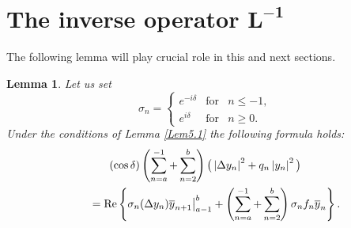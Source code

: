 \documentclass[11pt]{article}
\newtheorem{lemma}{Lemma}
\numberwithin{equation}{section}
\begin{document}
\section[The inverse operator $L^{-1}$]{The inverse operator $\boldsymbol{L^{-1}}$}\label{section6}

The following lemma will play crucial role in this and next sections.

\begin{lemma}
\label{Lem6.1} Let us set%
\begin{equation}
\sigma _{n}=\left\{
\begin{array}{lll}
e^{-i\delta } & \text{for} & n\leq -1, \\
e^{i\delta } & \text{for} & n\geq 0.%
\end{array}%
\right.  \label{6.1}
\end{equation}%
Under the conditions of Lemma {\rm \ref{Lem5.1}} the following formula holds:%
\begin{gather}
(\cos \delta )\left( \sum_{n=a}^{-1}+\sum_{n=2}^{b}\right) \big(
\left\vert \Delta y_{n}\right\vert ^{2}+q_{n}\left\vert y_{n}\right\vert
^{2}\big)  \nonumber \\
\qquad ={\rm Re}\left\{ \sigma _{n}(\Delta y_{n})\overline{y}_{n+1}\big|
_{a-1}^{b}+\left( \sum_{n=a}^{-1}+\sum_{n=2}^{b}\right) \sigma _{n}f_{n}%
\overline{y}_{n}\right\} .  \label{6.2}
\end{gather}
\end{lemma}
\end{document}
